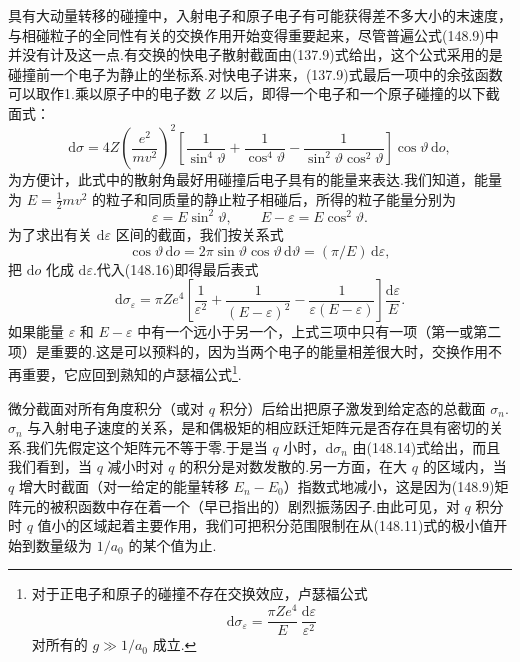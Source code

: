 具有大动量转移的碰撞中，入射电子和原子电子有可能获得差不多大小的末速度，与相碰粒子的全同性有关的交换作用开始变得重要起来，尽管普遍公式(148.9)中并没有计及这一点.有交换的快电子散射截面由(137.9)式给出，这个公式采用的是碰撞前一个电子为静止的坐标系.对快电子讲来，(137.9)式最后一项中的余弦函数可以取作1.乘以原子中的电子数 $Z$ 以后，即得一个电子和一个原子碰撞的以下截面式：
\begin{equation}
  \mathrm{d}\sigma=4Z\left(\frac{e^2}{mv^2}\right)^2
  \left[\frac{1}{\sin^4\vartheta}+\frac{1}{\cos^4\vartheta}
  -\frac{1}{\sin^2\vartheta\cos^2\vartheta}\right]\cos\vartheta\,\mathrm{d}o,
\end{equation}
为方便计，此式中的散射角最好用碰撞后电子具有的能量来表达.我们知道，能量为 $E=\frac{1}{2}mv^2$ 的粒子和同质量的静止粒子相碰后，所得的粒子能量分别为
\begin{equation*}
  \varepsilon=E\sin^2\vartheta,\qquad E-\varepsilon=E\cos^2\vartheta.
\end{equation*}
为了求出有关 $\mathrm{d}\varepsilon$ 区间的截面，我们按关系式
\begin{equation*}
  \cos\vartheta\,\mathrm{d}o=2\pi\sin\vartheta\cos\vartheta\,\mathrm{d}\vartheta
  =(\pi/E)\,\mathrm{d}\varepsilon,
\end{equation*}
把 $\mathrm{d}o$ 化成 $\mathrm{d}\varepsilon$.代入(148.16)即得最后表式
\begin{equation}
  \mathrm{d}\sigma_{\varepsilon}=\pi Ze^4\left[\frac{1}{\varepsilon^2}
  +\frac{1}{(E-\varepsilon)^2}-\frac{1}{\varepsilon(E-\varepsilon)}\right]\frac{\mathrm{d}\varepsilon}{E}.
\end{equation}
如果能量 $\varepsilon$ 和 $E-\varepsilon$ 中有一个远小于另一个，上式三项中只有一项（第一或第二项）是重要的.这是可以预料的，因为当两个电子的能量相差很大时，交换作用不再重要，它应回到熟知的卢瑟福公式\footnote{对于正电子和原子的碰撞不存在交换效应，卢瑟福公式
\begin{equation*}
  \mathrm{d}\sigma_{\varepsilon}=\frac{\pi Ze^4}{E}\,\frac{\mathrm{d}\varepsilon}{\varepsilon^2}
\end{equation*}
对所有的 $g\gg1/a_0$ 成立.}.

微分截面对所有角度积分（或对 $q$ 积分）后给出把原子激发到给定态的总截面 $\sigma_n$.$\sigma_n$ 与入射电子速度的关系，是和偶极矩的相应跃迁矩阵元是否存在具有密切的关系.我们先假定这个矩阵元不等于零.于是当 $q$ 小时，$\mathrm{d}\sigma_n$ 由(148.14)式给出，而且我们看到，当 $q$ 减小时对 $q$ 的积分是对数发散的.另一方面，在大 $q$ 的区域内，当 $q$ 增大时截面（对一给定的能量转移 $E_n-E_0$）指数式地减小，这是因为(148.9)矩阵元的被积函数中存在着一个（早已指出的）剧烈振荡因子.由此可见，对 $q$ 积分时 $q$ 值小的区域起着主要作用，我们可把积分范围限制在从(148.11)式的极小值开始到数量级为 $1/a_0$ 的某个值为止.

